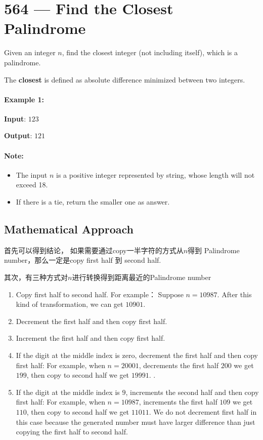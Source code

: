 \section{564 --- Find the Closest Palindrome}
Given an integer $n$, find the closest integer (not including itself), which is a palindrome.

The \textbf{closest} is defined as absolute difference minimized between two integers.

\paragraph{Example 1:}
\begin{flushleft}
\textbf{Input}: $ 123 $

\textbf{Output}: $ 121 $
\end{flushleft}

\paragraph{Note:}
\begin{itemize}
\item The input $ n $ is a positive integer represented by string, whose length will not exceed 18.
\item If there is a tie, return the smaller one as answer.
\end{itemize}

\subsection{Mathematical Approach}
首先可以得到结论， 如果需要通过copy一半字符的方式从$n$得到 Palindrome number，那么一定是copy first half 到 second half.

其次，有三种方式对$n$进行转换得到距离最近的Palindrome number
\begin{enumerate}
\item Copy first half to second half. For example：  Suppose $n=10987$. After this kind of transformation, we can get $10901$.
\item Decrement the first half and then copy first half.
\item Increment the first half and then copy first half.
\item If the digit at the middle index is zero, decrement the first half and then copy first half: For example, when $n=20001$, decrements the first half $200$ we get $199$, then copy to second half we get $19991$. .
\item If the digit at the middle index is $9$, increments the second half and then copy first half: For example, when $n=10987$, increments the first half $109$ we get $110$, then copy to second half we get $11011$. We do not decrement first half in this case because the generated number must have larger difference than just copying the first half to second half.
\end{enumerate}
